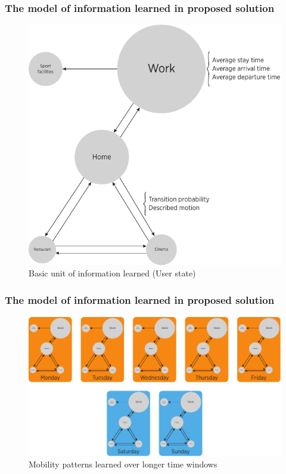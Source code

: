 \documentclass[compress,9pt,xcolor={dvipsnames,table}]{beamer}
\begin{document}
\begin{frame}[t]\frametitle{The model of information learned in proposed solution}
\begin{figure}[tb]
  \centering
  \includegraphics[scale=0.6]{../../../resources/images/vectors/mobility-graph}
  \caption{Basic unit of information learned (User state)}
  \label{fig:basic-unit-of-information-learned}
\end{figure}
\end{frame}

\begin{frame}[t]\frametitle{The model of information learned in proposed solution}
\begin{figure}[tb]
  \centering
  \includegraphics[width=\textwidth]{../../../resources/images/vectors/mobility-graph-larger-time-window-two-rows}
  \caption{Mobility patterns learned over longer time windows}
  \label{fig:information-learned-longer-time-windows}
\end{figure}
\end{frame}
\end{document}
